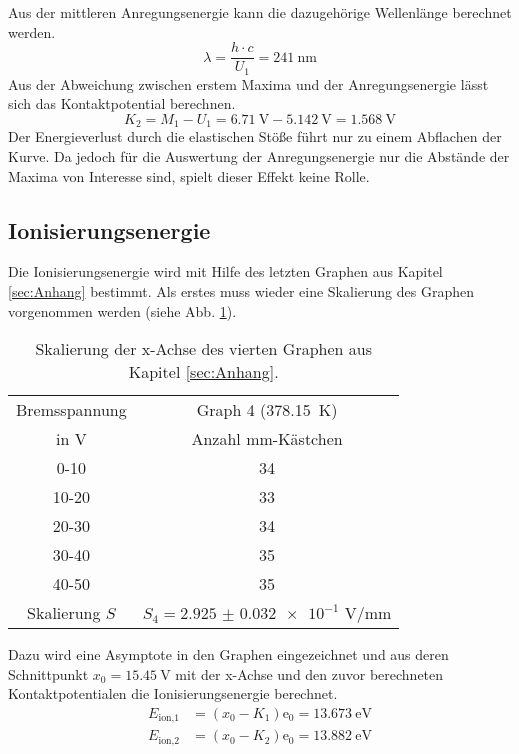 Aus der mittleren Anregungsenergie kann die dazugehörige Wellenlänge berechnet werden.
\begin{equation*}
  \lambda = \frac{h \cdot c}{U_1} = \SI{241}{\nano\meter}
\end{equation*}
Aus der Abweichung zwischen erstem Maxima und der Anregungsenergie lässt sich das Kontaktpotential berechnen.
\begin{equation*}
  K_2 = M_1 - U_1 = \SI{6.71}{\volt} - \SI{5.142}{\volt} = \SI{1.568}{\volt}
\end{equation*}
Der Energieverlust durch die elastischen Stöße führt nur zu einem Abflachen der Kurve.
Da jedoch für die Auswertung der Anregungsenergie nur die Abstände der Maxima von Interesse sind, spielt dieser Effekt keine Rolle.

\subsection{Ionisierungsenergie}
\label{sec:A4}

Die Ionisierungsenergie wird mit Hilfe des letzten Graphen aus Kapitel \ref{sec:Anhang} bestimmt.
Als erstes muss wieder eine Skalierung des Graphen vorgenommen werden (siehe Abb. \ref{tab:skal3}).
\begin{table}
  \centering
  \caption{Skalierung der x-Achse des vierten Graphen aus Kapitel \ref{sec:Anhang}.}
  \label{tab:skal3}
  \begin{tabular}{c c}
    \toprule
    Bremsspannung & Graph 4 (\SI{378,15}{\kelvin}) \\
    in V & Anzahl mm-Kästchen  \\
    \midrule
    0-10   &  34\\
    10-20  &  33\\
    20-30  &  34\\
    30-40  &  35\\
    40-50  &  35\\
    \bottomrule
    Skalierung $S$ & $S_4 = \num{2.925(32)e-1}$ V/mm  \\
  \end{tabular}
\end{table}
Dazu wird eine Asymptote in den Graphen eingezeichnet und aus deren Schnittpunkt $x_0 = \SI{15.45}{\volt}$ mit der x-Achse und den zuvor berechneten Kontaktpotentialen die Ionisierungsenergie berechnet.
\begin{align*}
E_\text{ion,1} &= (x_0 - K_1) \text{e}_0 = \SI{13.673}{\eV}  \\
E_\text{ion,2} &= (x_0 - K_2) \text{e}_0 = \SI{13.882}{\eV}  \\
\end{align*}
